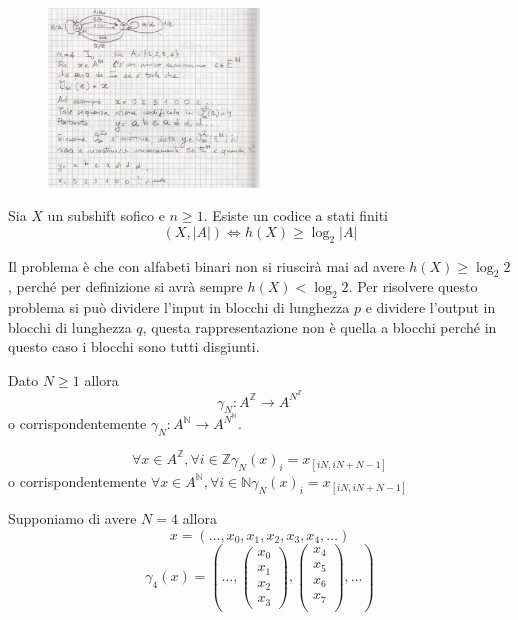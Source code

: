 \begin{esempio}
    \begin{figure}[!h]
        \centering
        \includegraphics [width=0.5\textwidth]{img/sistemi_complessi/codici.png}
    \end{figure}
\end{esempio}

\begin{teorema}
    Sia $X$ un subshift sofico e $n\ge 1$. Esiste un codice a stati finiti
    $$(X,|A|)\iff h(X)\ge \log_2 |A|$$
\end{teorema}
Il problema è che con alfabeti binari non si riuscirà mai ad avere $h(X) \ge \log_2 2$,
perché per definizione  si avrà sempre $h(X)< \log_2 2$. Per risolvere questo
problema si può dividere l'input in blocchi di lunghezza $p$ e dividere l'output
in blocchi di lunghezza $q$, questa rappresentazione non è quella a blocchi perché
in questo caso i blocchi sono tutti disgiunti.

\begin{definizione} 
    Dato $N\ge 1$ allora
    $$\gamma _N: A^{\mathbb{Z}} \to A^{N^{\mathbb{Z}}} $$
    o corrispondentemente $\gamma _N: A^{\mathbb{N}} \to A^{N^{\mathbb{N}}} $.

    $$\forall x \in A^{\mathbb{Z}}, \forall i \in \mathbb{Z} \gamma_N(x)_i = x_{[iN,iN+N -1]}$$
    o corrispondentemente $\forall x \in A^{\mathbb{N}}, \forall i \in \mathbb{N} \gamma_N(x)_i = x_{[iN,iN+N -1]}$
\end{definizione}
\begin{esempio}
    Supponiamo di avere $N=4$ allora
    $$x= \left(\dots, x_0,x_1,x_2,x_3,x_4,\dots\right)$$
    $$\gamma_4(x) = \left(\dots, \left(\begin{array}{c}
        x_0\\x_1\\x_2\\x_3
    \end{array}\right),\left(\begin{array}{c}
        x_4\\x_5\\x_6\\x_7\\
    \end{array}\right),\dots\right)$$
\end{esempio}

